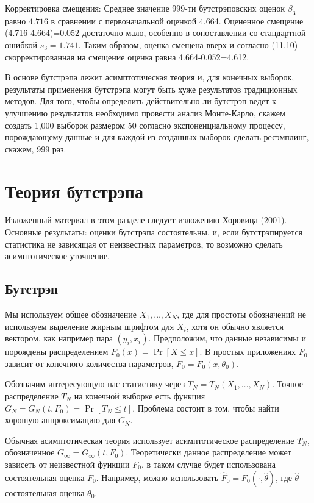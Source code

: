 Корректировка смещения: Среднее значение 999-ти бутстрэповских оценок $\beta_3$ равно $4.716$ в сравнении с первоначальной оценкой 4.664. Оцененное смещение (4.716-4.664)=0.052 достаточно мало, особенно в сопоставлении со стандартной ошибкой $s_3=1.741$. Таким образом, оценка смещена вверх и согласно (11.10) скорректированная на смещение оценка равна 4.664-0.052=4.612.

В основе бутстрэпа лежит асимптотическая теория и, для конечных выборок, результаты применения бутстрэпа могут быть хуже результатов традиционных методов. Для того, чтобы определить действительно ли бутстрэп ведет к улучшению результатов необходимо провести анализ Монте-Карло, скажем создать 1,000 выборок размером 50 согласно экспоненциальному процессу, порождающему данные и для каждой из созданных выборок сделать ресэмплинг, скажем, 999 раз.


\section{Теория бутстрэпа}

Изложенный материал в этом разделе следует изложению Хоровица (2001). Основные результаты: оценки бутстрэпа состоятельны, и, если бутстрэпируется статистика не зависящая от неизвестных параметров, то возможно сделать асимптотическое уточнение.

\subsection{Бутстрэп}

Мы используем общее обозначение $X_1,\ldots ,X_N$, где для простоты обозначений не используем выделение жирным шрифтом для $X_i$, хотя он обычно является вектором, как например пара $(y_i,x_i)$. Предположим, что данные независимы и порождены распределением $F_0(x)=\Pr[X \leq x]$. В простых приложениях $F_0$ зависит от конечного количества параметров, $F_0=F_0(x,\theta_0)$.

Обозначим интересующую нас статистику через $T_N=T_N(X_1,\ldots ,X_N)$. Точное распределение $T_N$ на конечной выборке есть функция $G_N=G_N(t,F_0)=\Pr[T_N \leq t]$. Проблема состоит в том, чтобы найти хорошую аппроксимацию для $G_N$.

Обычная асимптотическая теория использует асимптотическое распределение $T_N$, обозначенное $G_{\infty}=G_{\infty}(t,F_0)$. Теоретически данное распределение может зависеть от неизвестной функции $F_0$, в таком случае будет использована состоятельная оценка $F_0$. Например, можно использовать $\hat{F}_0=F_0(\cdot,\hat{\theta})$, где $\hat{\theta}$ состоятельная оценка $\theta_0$.

